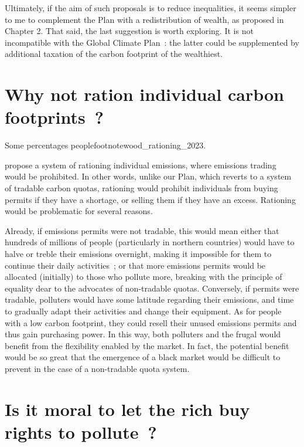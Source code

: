 \documentclass[a5paper,french,openany]{memoir}
\begin{document}
{Ultimately, if the aim of such proposals is to reduce inequalities, it seems simpler to me to complement the Plan with a redistribution of wealth, as proposed in Chapter 2. That said, the last suggestion is worth exploring. It is not incompatible with the Global Climate Plan~: the latter could be supplemented by additional taxation of the carbon footprint of the wealthiest. 

\section*{\normalsize Why not ration individual carbon footprints~?}\label{q:rationing}

Some percentages
peoplefootnote{wood_rationing_2023}.} propose a system of rationing individual emissions, where emissions trading would be prohibited. In other words, unlike our Plan, which reverts to a system of tradable carbon quotas, rationing would prohibit individuals from buying permits if they have a shortage, or selling them if they have an excess. %
Rationing would be problematic for several reasons. 

Already, if emissions permits were not tradable, this would mean either that hundreds of millions of people (particularly in northern countries) would have to halve or treble their emissions overnight, making it impossible for them to continue their daily activities~; or that more emissions permits would be allocated (initially) to those who pollute more, breaking with the principle of equality dear to the advocates of non-tradable quotas. Conversely, if permits were tradable, polluters would have some latitude regarding their emissions, and time to gradually adapt their activities and change their equipment. As for people with a low carbon footprint, they could resell their unused emissions permits and thus gain purchasing power. In this way, both polluters and the frugal would benefit from the flexibility enabled by the market. In fact, the potential benefit would be so great that the emergence of a black market would be difficult to prevent in the case of a non-tradable quota system. 

\section*{\normalsize Is it moral to let the rich buy rights to pollute~?}\label{q:moral}
\end{document}
